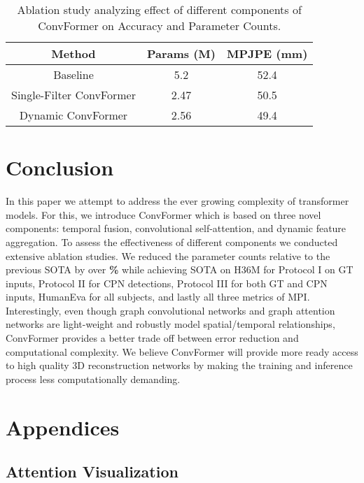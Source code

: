 \documentclass{article}
\begin{document}
\begin{table}[]
    \centering
    \begin{tabular}{|c|c|c|}
    \hline
        \textbf{Method} & Params (M) & MPJPE (mm) \\
        \hline
         Baseline & 5.2 & 52.4 \\
         Single-Filter ConvFormer & 2.47 & 50.5 \\
         Dynamic ConvFormer & 2.56 &  49.4 \\
         \hline
    \end{tabular}
    \caption{\small Ablation study analyzing effect of different components of ConvFormer on Accuracy and Parameter Counts.}
    \label{tab:ablation}
\end{table}



\section{Conclusion}
In this paper we attempt to address the ever growing complexity of transformer models. For this, we introduce ConvFormer which is based on three novel components: temporal fusion, convolutional self-attention, and dynamic feature aggregation. To assess the effectiveness of different components we conducted extensive ablation studies. We reduced the parameter counts relative to the previous SOTA by over \textbf{\%} while achieving SOTA on H36M for Protocol I on GT inputs, Protocol II for CPN detections, Protocol III for both GT and CPN inputs, HumanEva for all subjects, and lastly all three metrics of MPI. Interestingly, even though graph convolutional networks and graph attention networks are light-weight and robustly model spatial/temporal relationships, ConvFormer provides a better trade off between error reduction and computational complexity. We believe ConvFormer will provide more ready access to high quality 3D reconstruction networks by making the training and inference process less computationally demanding. 


\clearpage


\section{Appendices}
\subsection{Attention Visualization}
\end{document}
